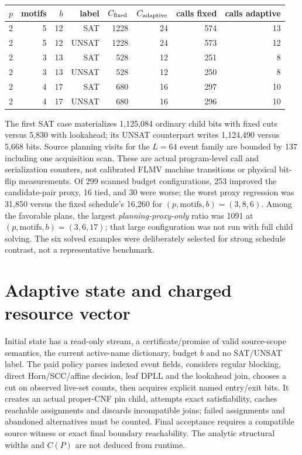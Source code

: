\documentclass[11pt]{article}
\begin{document}
\begin{center}
\begin{tabular}{rrrrrrrr}
\toprule
$p$ & motifs & $b$ & label & $C_{\rm fixed}$ & $C_{\rm adaptive}$ & calls fixed & calls adaptive\\
\midrule
2 & 5 & 12 & SAT &1228&24&574&13\\
2 & 5 & 12 & UNSAT &1228&24&573&12\\
2 & 3 & 13 & SAT &528&12&251&8\\
2 & 3 & 13 & UNSAT &528&12&250&8\\
2 & 4 & 17 & SAT &680&16&297&10\\
2 & 4 & 17 & UNSAT &680&16&296&10\\
\bottomrule
\end{tabular}
\end{center}
The first SAT case materializes 1,125,084 ordinary child bits with fixed cuts versus 5,830 with lookahead; its UNSAT counterpart writes 1,124,490 versus 5,668 bits. Source planning visits for the $L=64$ event family are bounded by 137 including one acquisition scan. These are actual program-level call and serialization counters, not calibrated FLMV machine transitions or physical bit-flip measurements. Of 299 scanned budget configurations, 253 improved the candidate-pair proxy, 16 tied, and 30 were worse; the worst proxy regression was 31,850 versus the fixed schedule's 16,260 for $(p,\mathrm{motifs},b)=(3,8,6)$. Among the favorable plans, the largest \emph{planning-proxy-only} ratio was 1091 at $(p,\mathrm{motifs},b)=(3,6,17)$; that large configuration was not run with full child solving. The six solved examples were deliberately selected for strong schedule contrast, not a representative benchmark.

\section{Adaptive state and charged resource vector}
Initial state has a read-only stream, a certificate/promise of valid source-scope semantics, the current active-name dictionary, budget $b$ and no SAT/UNSAT label. The paid policy parses indexed event fields, considers regular blocking, direct Horn/SCC/affine decision, leaf DPLL and the lookahead join, chooses a cut on observed live-set counts, then acquires explicit named entry/exit bits. It creates an actual proper-CNF pin child, attempts exact satisfiability, caches reachable assignments and discards incompatible joins; failed assignments and abandoned alternatives must be counted. Final acceptance requires a compatible source witness or exact final boundary reachability. The analytic structural widths and $C(P)$ are not deduced from runtime.
\end{document}
